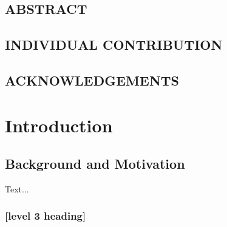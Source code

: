 \documentclass[12pt,a4paper]{report}
\begin{document}

\section*{ABSTRACT}


\newpage \section*{INDIVIDUAL CONTRIBUTION}


\newpage \section*{ACKNOWLEDGEMENTS}



\tableofcontents

\thispagestyle{empty}


\chapter{Introduction}


\setcounter{page}{1}



\section{Background and Motivation}


Text...

\subsection{[level 3 heading]}



\end{document}
